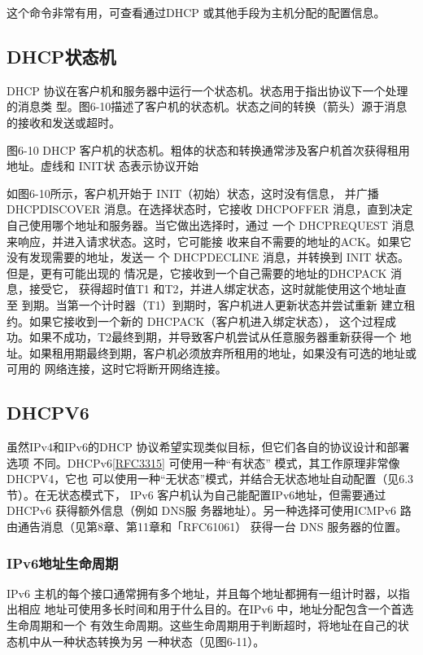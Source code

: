 这个命令非常有用，可查看通过DHCP 或其他手段为主机分配的配置信息。

\subsection{DHCP状态机}

DHCP 协议在客户机和服务器中运行一个状态机。状态用于指出协议下一个处理的消息类
型。图6-10描述了客户机的状态机。状态之间的转换（箭头）源于消息的接收和发送或超时。

图6-10 DHCP 客户机的状态机。粗体的状态和转换通常涉及客户机首次获得租用地址。虚线和 INIT状
态表示协议开始

如图6-10所示，客户机开始于 INIT（初始）状态，这时没有信息，
并广播 DHCPDISCOVER 消息。在选择状态时，它接收 DHCPOFFER
消息，直到决定自己使用哪个地址和服务器。当它做出选择时，通过
一个 DHCPREQUEST 消息来响应，并进入请求状态。这时，它可能接
收来自不需要的地址的ACK。如果它没有发现需要的地址，发送一
个 DHCPDECLINE 消息，并转换到 INIT 状态。但是，更有可能出现的
情况是，它接收到一个自己需要的地址的DHCPACK 消息，接受它，
获得超时值T1 和T2，并进人绑定状态，这时就能使用这个地址直至
到期。当第一个计时器（T1）到期时，客户机进人更新状态并尝试重新
建立租约。如果它接收到一个新的 DHCPACK（客户机进入绑定状态），
这个过程成功。如果不成功，T2最终到期，并导致客户机尝试从任意服务器重新获得一个
地址。如果租用期最终到期，客户机必须放弃所租用的地址，如果没有可选的地址或可用的
网络连接，这时它将断开网络连接。

\subsection{DHCPV6}
虽然IPv4和IPv6的DHCP 协议希望实现类似目标，但它们各自的协议设计和部署选项
不同。DHCPv6\href{https://www.rfc-editor.org/rfc/rfc3315}{\href{https://www.rfc-editor.org/rfc/rfc3315}{[RFC3315]}}
可使用一种“有状态” 模式，其工作原理非常像DHCPV4，它也
可以使用一种“无状态”模式，并结合无状态地址自动配置（见6.3节）。在无状态模式下，
IPv6 客户机认为自己能配置IPv6地址，但需要通过DHCPv6 获得额外信息（例如 DNS服
务器地址）。另一种选择可使用ICMPv6 路由通告消息（见第8章、第11章和「RFC61061）
获得一台 DNS 服务器的位置。

\subsubsection{IPv6地址生命周期}

IPv6 主机的每个接口通常拥有多个地址，并且每个地址都拥有一组计时器，以指出相应
地址可使用多长时间和用于什么目的。在IPv6 中，地址分配包含一个首选生命周期和一个
有效生命周期。这些生命周期用于判断超时，将地址在自己的状态机中从一种状态转换为另
一种状态（见图6-11）。

